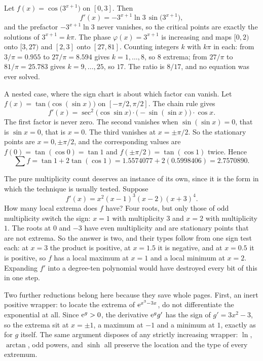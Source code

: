 \begin{worked}
Let $f(x)=\cos\bigl(3^{x+1}\bigr)$ on $[0,3]$. Then
\[
f'(x)=-3^{x+1}\ln3\,\sin\bigl(3^{x+1}\bigr),
\]
and the prefactor $-3^{x+1}\ln3$ never vanishes, so the critical points are exactly the solutions of $3^{x+1}=k\pi$. The phase $\varphi(x)=3^{x+1}$ is increasing and maps $[0,2)$ onto $[3,27)$ and $[2,3]$ onto $[27,81]$. Counting integers $k$ with $k\pi$ in each: from $3/\pi=0.955$ to $27/\pi=8.594$ gives $k=1,\dots,8$, so $8$ extrema; from $27/\pi$ to $81/\pi=25.783$ gives $k=9,\dots,25$, so $17$. The ratio is $8/17$, and no equation was ever solved.

A nested case, where the sign chart is about which factor can vanish. Let $f(x)=\tan\bigl(\cos(\sin x)\bigr)$ on $[-\pi/2,\pi/2]$. The chain rule gives
\[
f'(x)=\sec^{2}\bigl(\cos\sin x\bigr)\cdot\bigl(-\sin(\sin x)\bigr)\cdot\cos x .
\]
The first factor is never zero. The second vanishes when $\sin(\sin x)=0$, that is $\sin x=0$, that is $x=0$. The third vanishes at $x=\pm\pi/2$. So the stationary points are $x=0,\pm\pi/2$, and the corresponding values are $f(0)=\tan(\cos0)=\tan1$ and $f(\pm\pi/2)=\tan(\cos1)$ twice. Hence
\[
\sum f=\tan1+2\tan(\cos1)=1.5574077+2(0.5998406)=2.7570890 .
\]
\end{worked}

The pure multiplicity count deserves an instance of its own, since it is the form in which the technique is usually tested. Suppose
\[
f'(x)=x^{2}(x-1)^{3}(x-2)(x+3)^{4} .
\]
How many local extrema does $f$ have? Four roots, but only those of odd multiplicity switch the sign: $x=1$ with multiplicity $3$ and $x=2$ with multiplicity $1$. The roots at $0$ and $-3$ have even multiplicity and are stationary points that are not extrema. So the answer is two, and their types follow from one sign test each: at $x=3$ the product is positive, at $x=1.5$ it is negative, and at $x=0.5$ it is positive, so $f$ has a local maximum at $x=1$ and a local minimum at $x=2$. Expanding $f'$ into a degree-ten polynomial would have destroyed every bit of this in one step.

Two further reductions belong here because they save whole pages. First, an inert positive wrapper: to locate the extrema of $\mathrm{e}^{x^{3}-3x}$, do not differentiate the exponential at all. Since $\mathrm{e}^{g}>0$, the derivative $\mathrm{e}^{g}g'$ has the sign of $g'=3x^{2}-3$, so the extrema sit at $x=\pm1$, a maximum at $-1$ and a minimum at $1$, exactly as for $g$ itself. The same argument disposes of any strictly increasing wrapper: $\ln$, $\arctan$, odd powers, and $\sinh$ all preserve the location and the type of every extremum.

